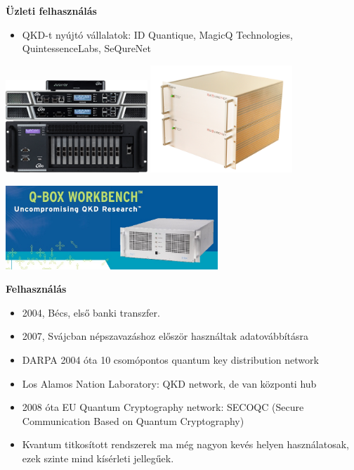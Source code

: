 \documentclass{beamer}
\begin{document}
    \begin{frame}

        \center

        \textbf{Üzleti felhasználás}

        \begin{itemize}
            \item QKD-t nyújtó vállalatok: ID Quantique, MagicQ Technologies, QuintessenceLabs, SeQureNet
        \end{itemize}

        \includegraphics[width=0.4\textwidth]{idquantique.png}
        \includegraphics[width=0.4\textwidth]{cygnus_alice_bob.png}

        \includegraphics[width=0.6\textwidth]{qbox.jpg}

    \end{frame}

    \begin{frame}

        \center

        \textbf{Felhasználás}

        \begin{itemize}
            \item 2004, Bécs, első banki transzfer.
            \item 2007, Svájcban népszavazáshoz először használtak adatovábbításra
            \item DARPA 2004 óta 10 csomópontos quantum key distribution network
            \item Los Alamos Nation Laboratory: QKD network, de van központi hub
            \item 2008 óta EU Quantum Cryptography network: SECOQC (Secure Communication Based on Quantum Cryptography)
            \item Kvantum titkosított rendszerek ma még nagyon kevés helyen használatosak, ezek szinte mind kísérleti jellegűek.
        \end{itemize}

    \end{frame}
\end{document}
